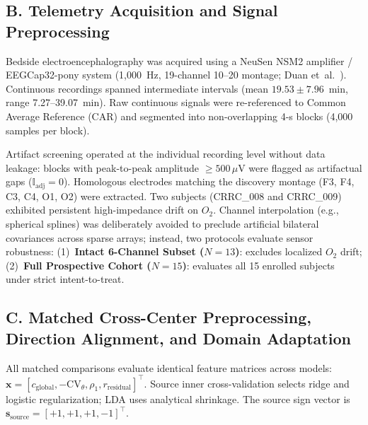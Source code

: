 \documentclass[journal,twoside,web]{ieeecolor}
\begin{document}
\subsection*{B. Telemetry Acquisition and Signal Preprocessing}
Bedside electroencephalography was acquired using a NeuSen NSM2 amplifier / EEGCap32-pony system (1,000~Hz, 19-channel 10--20 montage; Duan et~al.~\cite{duan2026auditory}). Continuous recordings spanned intermediate intervals (mean $19.53 \pm 7.96$~min, range 7.27--39.07~min). Raw continuous signals were re-referenced to Common Average Reference (CAR) and segmented into non-overlapping 4-s blocks (4,000 samples per block).

Artifact screening operated at the individual recording level without data leakage: blocks with peak-to-peak amplitude $\ge 500\,\mu\mathrm{V}$ were flagged as artifactual gaps ($\mathbb{I}_{\text{adj}} = 0$). Homologous electrodes matching the discovery montage (F3, F4, C3, C4, O1, O2) were extracted. Two subjects (CRRC\_008 and CRRC\_009) exhibited persistent high-impedance drift on $O_2$. Channel interpolation (e.g., spherical splines) was deliberately avoided to preclude artificial bilateral covariances across sparse arrays; instead, two protocols evaluate sensor robustness: (1)~\textbf{Intact 6-Channel Subset ($N=13$)}: excludes localized $O_2$ drift; (2)~\textbf{Full Prospective Cohort ($N=15$)}: evaluates all 15 enrolled subjects under strict intent-to-treat.

\subsection*{C. Matched Cross-Center Preprocessing, Direction Alignment, and Domain Adaptation}
All matched comparisons evaluate identical feature matrices across models: $\mathbf{x}=[c_{\text{global}},-\mathrm{CV}_\theta,\rho_1,r_{\text{residual}}]^\top$. Source inner cross-validation selects ridge and logistic regularization; LDA uses analytical shrinkage. The source sign vector is $\mathbf{s}_{\text{source}}=[+1,+1,+1,-1]^\top$.
\end{document}
